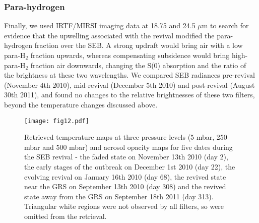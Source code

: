 \documentclass[final,authoryear,5p,times,twocolumn]{elsarticle}
\begin{document}
\subsubsection{Para-hydrogen}
Finally, we used IRTF/MIRSI imaging data at 18.75 and 24.5 $\mu$m to search for evidence that the upwelling associated with the revival modified the para-hydrogen fraction over the SEB.  A strong updraft would bring air with a low para-H$_2$ fraction upwards, whereas compensating subsidence would bring high-para-H$_2$ fraction air downwards, changing the S(0) absorption and the ratio of the brightness at these two wavelengths.  We compared SEB radiances pre-revival (November 4th 2010), mid-revival (December 5th 2010) and post-revival (August 30th 2011), and found no changes to the relative brightnesses of these two filters, beyond the temperature changes discussed above.  

\begin{figure*}
\begin{centering}
\centerline{\texttt{[image: fig12.pdf]}}
\caption{Retrieved temperature maps at three pressure levels (5 mbar, 250 mbar and 500 mbar) and aerosol opacity maps for five dates during the SEB revival - the faded state on November 13th 2010 (day 2), the early stages of the outbreak on December 1st 2010 (day 22), the evolving revival on January 16th 2010 (day 68), the revived state near the GRS on September 13th 2010 (day 308) and the revived state away from the GRS on September 18th 2011 (day 313).  Triangular white regions were not observed by all filters, so were omitted from the retrieval. }
\label{Tmap}
\end{centering}
\end{figure*}



\end{document}
